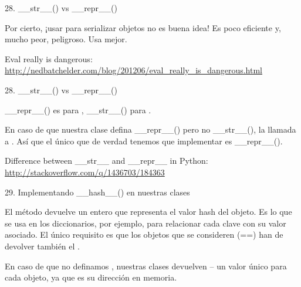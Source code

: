 \documentclass[14pt]{beamer}
\begin{document}
\begin{frame}{28. \_\_str\_\_() vs \_\_repr\_\_()}
  \begin{alertblock}{}
    \centering
    Por cierto, ¡usar  para serializar
    objetos no es buena idea! Es poco eficiente y, mucho peor,
    peligroso. Usa  mejor.
  \end{alertblock}

  \small
  \begin{block}
    {\centering Eval really is dangerous:}
    \centering \url{http://nedbatchelder.com/blog/201206/eval_really_is_dangerous.html}
  \end{block}
\end{frame}

\begin{frame}{28. \_\_str\_\_() vs \_\_repr\_\_()}
  \small
  \begin{alertblock}{}
    \centering
    \_\_repr\_\_() es para ,
    \_\_str\_\_() para .
  \end{alertblock}

  \begin{block}{}
    \centering
    En caso de que nuestra clase defina \_\_repr\_\_() pero no
    \_\_str\_\_(), la llamada a . Así que el único que de verdad tenemos que
    implementar es \_\_repr\_\_().
  \end{block}

  \begin{block}
    {\centering Difference between \_\_str\_\_ and \_\_repr\_\_ in Python:}
    \centering \url{http://stackoverflow.com/q/1436703/184363}
  \end{block}
\end{frame}

\begin{frame}
  {29. \normalsize Implementando \_\_hash\_\_() en nuestras clases}
  \small
  \begin{block}{}
    \centering
    El método  devuelve un entero que
    representa el valor hash del objeto. Es lo que se usa en los
    diccionarios, por ejemplo, para relacionar cada clave con su valor
    asociado. El único requisito es que los objetos que se consideren
     (==) han de devolver también el
    .
  \end{block}

  \begin{alertblock}{}
    \centering
    En caso de que no definamos , nuestras
    clases devuelven  -- un valor único para cada
    objeto, ya que es su dirección en memoria.
  \end{alertblock}
\end{frame}
\end{document}
